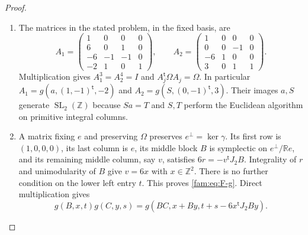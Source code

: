 \begin{proof}
\begin{enumerate}[label=\arabic*.,leftmargin=*]
\item The matrices in the stated problem, in the fixed basis, are
\[
 A_1=\begin{pmatrix}1&0&0&0\\6&0&1&0\\-6&-1&-1&0\\-2&1&0&1\end{pmatrix},
 \qquad
 A_2=\begin{pmatrix}1&0&0&0\\0&0&-1&0\\-6&1&0&0\\3&0&1&1\end{pmatrix}.
\]
Multiplication gives $A_1^3=A_2^4=I$ and
$A_j^{\mathsf t}\Omega A_j=\Omega$.  In particular
$A_1=g(a,(1,-1)^{\mathsf t},-2)$ and
$A_2=g(S,(0,-1)^{\mathsf t},3)$.  Their images $a,S$ generate
$\operatorname{SL}_2(\mathbb Z)$ because $Sa=T$ and $S,T$ perform the
Euclidean algorithm on primitive integral columns.

\item A matrix fixing $e$ and preserving $\Omega$ preserves
$e^{\perp}=\ker\gamma$.  Its first row is $(1,0,0,0)$, its last column is
$e$, its middle block $B$ is symplectic on
$e^{\perp}/\mathbb Re$, and its remaining middle column, say $v$, satisfies
$6r=-v^{\mathsf t}J_2B$.  Integrality of $r$ and unimodularity of $B$
give $v=6x$ with $x\in\mathbb Z^2$.  There is no further condition on
the lower left entry $t$.  This proves \eqref{fam:eq:F-g}.  Direct multiplication
gives
\begin{equation}\label{fam:eq:F-law}
 g(B,x,t)g(C,y,s)
 =g(BC,x+By,t+s-6x^{\mathsf t}J_2By).
\end{equation}


\end{enumerate}
\end{proof}
